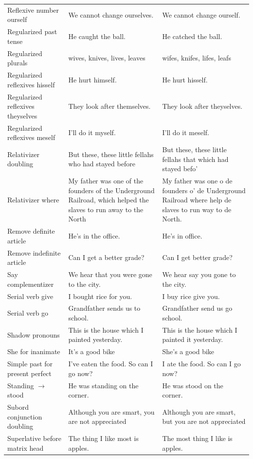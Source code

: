 \begin{longtable}{
  >{\raggedright\arraybackslash}p{3.2cm}
  >{\raggedright\arraybackslash}p{4.8cm}
  >{\raggedright\arraybackslash}p{4.8cm}
}
Reflexive number ourself & We cannot change ourselves. & We cannot change ourself. \\
Regularized past tense & He caught the ball. & He catched the ball. \\
Regularized plurals & wives, knives, lives, leaves & wifes, knifes, lifes, leafs \\
Regularized reflexives hisself & He hurt himself. & He hurt hisself. \\
Regularized reflexives theyselves & They look after themselves. & They look after theyselves. \\
Regularized reflexives meself & I'll do it myself. & I'll do it meself. \\
Relativizer doubling & But these, these little fellahs who had stayed before & But these, these little fellahs that which had stayed befo' \\
Relativizer where & My father was one of the founders of the Underground Railroad, which helped the slaves to run away to the North & My father was one o de founders o' de Underground Railroad where help de slaves to run way to de North. \\
Remove definite article & He's in the office. & He's in office. \\
Remove indefinite article & Can I get a better grade? & Can I get better grade? \\
Say complementizer & We hear that you were gone to the city. & We hear say you gone to the city. \\
Serial verb give & I bought rice for you. & I buy rice give you. \\
Serial verb go & Grandfather sends us to school. & Grandfather send us go school. \\
Shadow pronouns & This is the house which I painted yesterday. & This is the house which I painted it yesterday. \\
She for inanimate & It's a good bike & She's a good bike \\
Simple past for present perfect & I've eaten the food. So can I go now? & I ate the food. So can I go now? \\
Standing $\rightarrow$ stood & He was standing on the corner. & He was stood on the corner. \\
Subord conjunction doubling & Although you are smart, you are not appreciated & Although you are smart, but you are not appreciated \\
Superlative before matrix head & The thing I like most is apples. & The most thing I like is apples. \\

\end{longtable}
